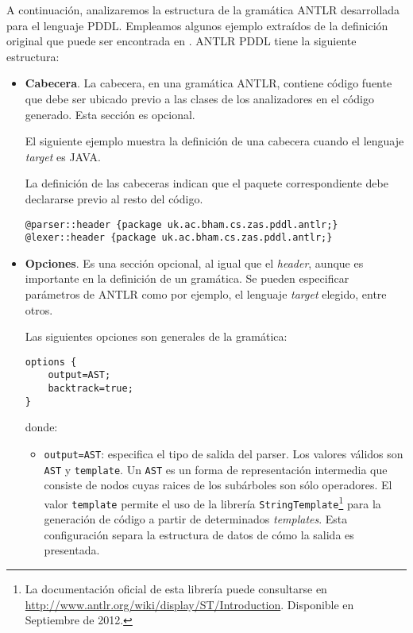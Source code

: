 A continuaci\'on, analizaremos la estructura de la gram\'atica
ANTLR desarrollada para el lenguaje PDDL. Empleamos algunos ejemplo extra\'idos de la definici\'on
original que puede ser encontrada en \cite{gbraun:antlrpddl}.
ANTLR PDDL tiene la siguiente estructura:

\begin{itemize}

\item {\bf Cabecera}. La cabecera, en una 
gram\'atica ANTLR, contiene c\'odigo fuente que debe ser ubicado 
previo a las clases de los analizadores en el c\'odigo generado. 
Esta secci\'on es opcional. 

El siguiente ejemplo muestra la definici\'on de una cabecera 
cuando el lenguaje \emph{target} es JAVA.

\begin{ejemplo}%

La definici\'on de las cabeceras indican que el paquete
correspondiente debe declararse previo al resto del
c\'odigo.

 \begin{verbatim}
@parser::header {package uk.ac.bham.cs.zas.pddl.antlr;}
@lexer::header {package uk.ac.bham.cs.zas.pddl.antlr;}
 \end{verbatim}
\end{ejemplo}

\item {\bf Opciones}. Es una secci\'on
opcional, al igual que el \emph{header}, aunque es importante
en la definici\'on de un gram\'atica. Se pueden especificar
par\'ametros de ANTLR como por ejemplo, el lenguaje \emph{target}
elegido, entre otros.

\begin{ejemplo}%

Las siguientes opciones son generales de la gram\'atica:

 \begin{verbatim}
options {
    output=AST;
    backtrack=true;
}
 \end{verbatim}
donde:
\begin{itemize}
\item \texttt{output=AST}: especifica
el tipo de salida del parser. Los valores v\'alidos
son \texttt{AST} y \texttt{template}. Un
\texttt{AST} es un forma de
representaci\'on intermedia que consiste de nodos
cuyas raices de los sub\'arboles son s\'olo operadores. El valor
\texttt{template} permite el uso de la librer\'ia
\texttt{StringTemplate}\footnote{La documentaci\'on oficial de esta
librer\'ia puede consultarse en
\url{http://www.antlr.org/wiki/display/ST/Introduction}. Disponible en
Septiembre de 2012.} 
para la generaci\'on de c\'odigo a partir de
determinados \emph{templates}. Esta configuraci\'on separa la
estructura de datos de c\'omo la salida es presentada. 


\end{itemize}
\end{ejemplo}
\end{itemize}
